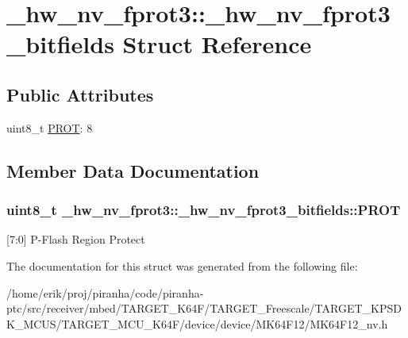\hypertarget{struct__hw__nv__fprot3_1_1__hw__nv__fprot3__bitfields}{}\section{\+\_\+hw\+\_\+nv\+\_\+fprot3\+:\+:\+\_\+hw\+\_\+nv\+\_\+fprot3\+\_\+bitfields Struct Reference}
\label{struct__hw__nv__fprot3_1_1__hw__nv__fprot3__bitfields}
\subsection*{Public Attributes}
\begin{DoxyCompactItemize}
\item 
uint8\+\_\+t \hyperlink{struct__hw__nv__fprot3_1_1__hw__nv__fprot3__bitfields_af0734a9408ec45f6461858e52101ebd4}{P\+R\+OT}\+: 8
\end{DoxyCompactItemize}


\subsection{Member Data Documentation}
\subsubsection[{\texorpdfstring{P\+R\+OT}{PROT}}]{\setlength{\rightskip}{0pt plus 5cm}uint8\+\_\+t \+\_\+hw\+\_\+nv\+\_\+fprot3\+::\+\_\+hw\+\_\+nv\+\_\+fprot3\+\_\+bitfields\+::\+P\+R\+OT}\hypertarget{struct__hw__nv__fprot3_1_1__hw__nv__fprot3__bitfields_af0734a9408ec45f6461858e52101ebd4}{}\label{struct__hw__nv__fprot3_1_1__hw__nv__fprot3__bitfields_af0734a9408ec45f6461858e52101ebd4}
\mbox{[}7\+:0\mbox{]} P-\/\+Flash Region Protect 

The documentation for this struct was generated from the following file\+:\begin{DoxyCompactItemize}
\item 
/home/erik/proj/piranha/code/piranha-\/ptc/src/receiver/mbed/\+T\+A\+R\+G\+E\+T\+\_\+\+K64\+F/\+T\+A\+R\+G\+E\+T\+\_\+\+Freescale/\+T\+A\+R\+G\+E\+T\+\_\+\+K\+P\+S\+D\+K\+\_\+\+M\+C\+U\+S/\+T\+A\+R\+G\+E\+T\+\_\+\+M\+C\+U\+\_\+\+K64\+F/device/device/\+M\+K64\+F12/M\+K64\+F12\+\_\+nv.\+h\end{DoxyCompactItemize}
